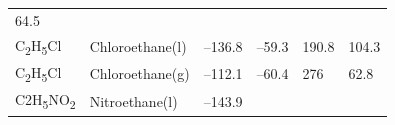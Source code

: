\documentclass[
]{book}
\theoremstyle{definition}
\theoremstyle{definition}
\theoremstyle{definition}
\theoremstyle{remark}
\begin{document}
\begin{longtable}[]{@{}llllll@{}}
\begin{minipage}[t]{0.14\columnwidth}
64.5\strut
\end{minipage}\tabularnewline
\begin{minipage}[t]{0.07\columnwidth}\raggedright
C\textsubscript{2}H\textsubscript{5}Cl\strut
\end{minipage} & \begin{minipage}[t]{0.17\columnwidth}\raggedright
Chloroethane(l)\strut
\end{minipage} & \begin{minipage}[t]{0.15\columnwidth}\raggedright
--136.8\strut
\end{minipage} & \begin{minipage}[t]{0.15\columnwidth}\raggedright
--59.3\strut
\end{minipage} & \begin{minipage}[t]{0.14\columnwidth}\raggedright
190.8\strut
\end{minipage} & \begin{minipage}[t]{0.14\columnwidth}\raggedright
104.3\strut
\end{minipage}\tabularnewline
\begin{minipage}[t]{0.07\columnwidth}\raggedright
C\textsubscript{2}H\textsubscript{5}Cl\strut
\end{minipage} & \begin{minipage}[t]{0.17\columnwidth}\raggedright
Chloroethane(g)\strut
\end{minipage} & \begin{minipage}[t]{0.15\columnwidth}\raggedright
--112.1\strut
\end{minipage} & \begin{minipage}[t]{0.15\columnwidth}\raggedright
--60.4\strut
\end{minipage} & \begin{minipage}[t]{0.14\columnwidth}\raggedright
276\strut
\end{minipage} & \begin{minipage}[t]{0.14\columnwidth}\raggedright
62.8\strut
\end{minipage}\tabularnewline
\begin{minipage}[t]{0.07\columnwidth}\raggedright
C2H\textsubscript{5}NO\textsubscript{2}\strut
\end{minipage} & \begin{minipage}[t]{0.17\columnwidth}\raggedright
Nitroethane(l)\strut
\end{minipage} & \begin{minipage}[t]{0.15\columnwidth}\raggedright
--143.9\strut
\end{minipage} & \begin{minipage}[t]{0.15\columnwidth}\raggedright

\end{minipage}
\end{longtable}
\end{document}
